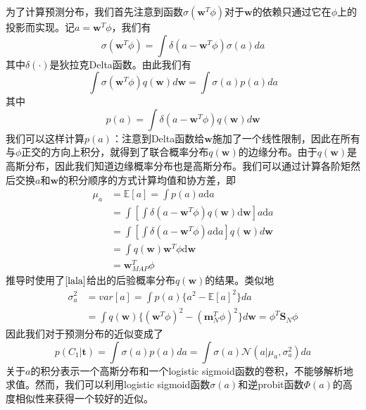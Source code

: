 为了计算预测分布，我们首先注意到函数$\sigma(\boldsymbol{w}^T\phi)$对于$\boldsymbol{w}$的依赖只通过它在$\phi$上的投影而实现。记$a=\boldsymbol{w}^T\phi$，我们有
\begin{equation}
	\sigma(\boldsymbol{w}^T\phi)=\int \delta(a-\boldsymbol{w}^T\phi)\sigma(a)da
\end{equation}
其中$\delta(\cdot)$是狄拉克Delta函数。由此我们有
\begin{equation}
	\int \sigma(\boldsymbol{w}^T\phi)q(\boldsymbol{w})d\boldsymbol{w}=\int \sigma(a)p(a)da
\end{equation}
其中 
\begin{equation}
	p(a)=\int \delta(a-\boldsymbol{w}^T\phi)q(\boldsymbol{w})d\boldsymbol{w}
\end{equation}
我们可以这样计算$p(a)$：注意到Delta函数给$\boldsymbol{w}$施加了一个线性限制，因此在所有与$\phi$正交的方向上积分，就得到了联合概率分布$q(\boldsymbol{w})$的边缘分布。由于$q(\boldsymbol{w})$是高斯分布，因此我们知道边缘概率分布也是高斯分布。我们可以通过计算各阶矩然后交换$a$和$\boldsymbol{w}$的积分顺序的方式计算均值和协方差，即
\begin{equation}
\begin{aligned}
	\mu_a&=\mathbb{E}[a]=\int p(a)a\mathrm{d}a\\
	&=\int \left[\int \delta(a-\boldsymbol{w}^T\phi)q(\boldsymbol{w})\mathrm{d}\boldsymbol{w}\right]a\mathrm{d}a\\
	&=\int \left[\int \delta(a-\boldsymbol{w}^T\phi)a\mathrm{d}a\right]q(\boldsymbol{w})d\boldsymbol{w}\\
	&=\int q(\boldsymbol{w})\boldsymbol{w}^T\phi \mathrm{d}\boldsymbol{w}\\
	&=\boldsymbol{w}^T_{MAP}\phi
\end{aligned}
\end{equation}
推导时使用了$\ref{lala}$给出的后验概率分布$q(\boldsymbol{w})$的结果。类似地
\begin{equation}
\begin{aligned}
	\sigma_a^2&=var[a]=\int p(a)\{a^2-\mathbb{E}[a]^2 \}da\\
	&=\int q(\boldsymbol{w})\{(\boldsymbol{w}^T\phi)^2-(\boldsymbol{m}_N^T\phi)^2\}d\boldsymbol{w}=\phi^T\boldsymbol{S}_N\phi
\end{aligned}
\end{equation}
因此我们对于预测分布的近似变成了
\begin{equation}
	p(C_1|\boldsymbol{t})=\int \sigma(a)p(a)da=\int \sigma(a)\mathcal{N}(a|\mu_a,\sigma_a^2)da
\end{equation}
关于$a$的积分表示一个高斯分布和一个logistic sigmoid函数的卷积，不能够解析地求值。然而，我们可以利用logistic sigmoid函数$\sigma(a)$和逆probit函数$\Phi(a)$的高度相似性来获得一个较好的近似。

